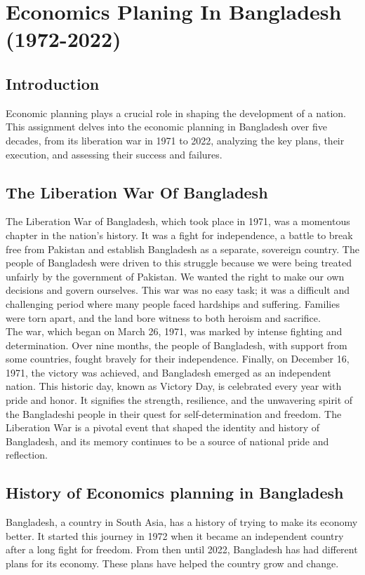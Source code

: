 \chapter{Economics Planing In Bangladesh (1972-2022)}
\section{Introduction}
Economic planning plays a crucial role in shaping the development of a nation. 
This assignment delves into the economic planning in Bangladesh over five decades, 
from its liberation war in 1971 to 2022, analyzing the key plans, their execution, 
and assessing their success and failures.


\section{The Liberation War Of Bangladesh}
The Liberation War of Bangladesh, which took place in 1971, was a momentous chapter in 
the nation's history. It was a fight for independence, a battle to break free from Pakistan 
and establish Bangladesh as a separate, sovereign country. The people of Bangladesh were driven 
to this struggle because we were being treated unfairly by the government of Pakistan. We wanted 
the right to make our own decisions and govern ourselves. This war was no easy task; it was 
a difficult and challenging period where many people faced hardships and suffering. 
Families were torn apart, and the land bore witness to both heroism and sacrifice.\\

The war, which began on March 26, 1971, was marked by intense fighting and determination. 
Over nine months, the people of Bangladesh, with support from some countries, fought bravely 
for their independence. Finally, on December 16, 1971, the victory was achieved, and Bangladesh 
emerged as an independent nation. This historic day, known as Victory Day, is celebrated every year 
with pride and honor. It signifies the strength, resilience, and the unwavering spirit of 
the Bangladeshi people in their quest for self-determination and freedom. The Liberation 
War is a pivotal event that shaped the identity and history of Bangladesh, and its memory 
continues to be a source of national pride and reflection.


\section{History of Economics planning in Bangladesh}
Bangladesh, a country in South Asia, has a history of trying to make its economy better. 
It started this journey in 1972 when it became an independent country after a long fight for freedom. 
From then until 2022, Bangladesh has had different plans for its economy. These plans have helped the 
country grow and change.\\

